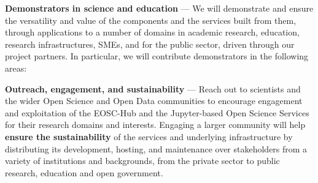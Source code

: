 \begin{compactenum}
\item \label{obj:demonstrators}
  \textbf{Demonstrators in science and education} ---
  We will demonstrate and ensure the versatility and value of the components and
  the services built from them,
  through applications to a number of
  domains in academic research, education, research infrastructures, SMEs, and for
  the public sector, driven through our project partners. In
  particular, we will contribute demonstrators in the following areas:

\item \label{obj:outreach-and-engagement}
  \textbf{Outreach, engagement, and sustainability} ---
  Reach out to scientists and the wider Open Science and Open Data
  communities to encourage engagement
  and exploitation of the EOSC-Hub and the Jupyter-based Open Science
  Services for their research domains and interests.
  Engaging a larger community will help \textbf{ensure the sustainability} of
  the services and underlying infrastructure by distributing its
  development, hosting, and maintenance over stakeholders from a
  variety of institutions and backgrounds,
  from the private sector to public research, education
  and open government.

\end{compactenum}


